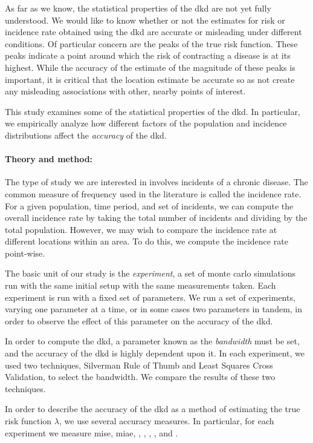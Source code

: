 \begin{onehalfspace}
As far as we know,
the statistical properties of the \acrlong{dkd} are not yet fully understood.
We would like to know whether or not the estimates for \gls{risk} or \gls{incidence rate}
obtained using the \acrlong{dkd} are accurate or misleading under different conditions.
Of particular concern are the peaks of the true risk function.
These peaks indicate a point around which the risk of contracting a disease is at its highest.
While the accuracy of the estimate of the magnitude of these peaks is important,
it is critical that the location estimate be accurate so as not create any misleading associations
with other, nearby points of interest.

This study examines some of the statistical properties of the \acrlong{dkd}.
In particular,
we empirically analyze how different factors of the population and incidence distributions
affect the \textit{accuracy} of the \acrlong{dkd}.

\paragraph*{Theory and method:}

The type of study we are interested in involves incidents of a chronic disease.
The common measure of frequency used in the literature is called the incidence rate.
For a given population, time period, and set of incidents,
we can compute the overall incidence rate by taking the total number of incidents and dividing by the total population.
However, we may wish to compare the incidence rate at different locations within an area.
To do this, we compute the incidence rate point-wise.

The basic unit of our study is the \textit{experiment},
a set of monte carlo simulations run with the same initial setup with the same measurements taken.
Each experiment is run with a fixed set of parameters.
We run a set of experiments,
varying one parameter at a time, or in some cases two parameters in tandem,
in order to observe the effect of this parameter on the accuracy of the \acrlong{dkd}.

In order to compute the \acrlong{dkd},
a parameter known as the \textit{bandwidth} must be set,
and the accuracy of the \acrlong{dkd} is highly dependent upon it.
In each experiment,
we used two techniques,
Silverman Rule of Thumb and Least Squares Cross Validation,
to select the bandwidth.
We compare the results of these two techniques.

In order to describe the accuracy of the \acrlong{dkd} as a method of estimating the true risk function $\lambda$,
we use several accuracy measures.
In particular,
for each experiment we measure \acrlong{mise},
\acrlong{miae},
,
,
,
,
and .


\end{onehalfspace}
